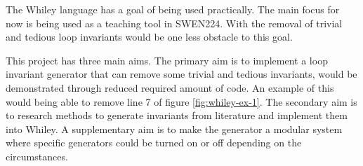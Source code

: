 \documentclass[11pt, a4paper, twoside, openright]{report}
\begin{document}

The Whiley language has a goal of being used practically.
The main focus for now is being used as a teaching tool in SWEN224.
With the removal of trivial and tedious loop invariants would be one 
less obstacle to this goal.


This project has three main aims.
The primary aim is to implement a loop invariant generator that can remove
some trivial and tedious invariants, would be demonstrated through reduced required
amount of code. An example of this would being able to remove line 7 of figure
\ref{fig:whiley-ex-1}.
The secondary aim is to research methods to generate invariants from literature 
and implement them into Whiley.
A supplementary aim is to make the generator a modular system where specific generators
could be turned on or off depending on the circumstances.

%
%
%
%
\end{document}
